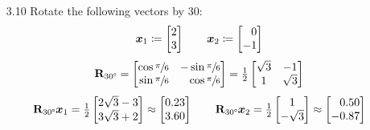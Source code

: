 \documentclass[11pt]{article}
\begin{document}
\begin{enumerate}
    \item[3.10] Rotate the following vectors by 30\degree:
          \[
              \x_1 \coloneq
              \begin{bmatrix}
                  2 \\ 3
              \end{bmatrix}
              \qquad
              \x_2 \coloneq
              \begin{bmatrix*}[r]
                  0 \\ -1
              \end{bmatrix*}
          \]
          \[
              \mat{R}_{30\degree}
              =
              \begin{bmatrix*}[r]
                  \cos \sfrac{\pi}{6} & -\sin \sfrac{\pi}{6} \\
                  \sin \sfrac{\pi}{6} & \cos \sfrac{\pi}{6}  \\
              \end{bmatrix*}
              =
              \tfrac{1}{2}
              \begin{bmatrix*}[c]
                  \sqrt{3} & -1       \\
                  1        & \sqrt{3} \\
              \end{bmatrix*}
          \]
          \vspace{0.5em}
          \[
              \mat{R}_{30\degree} \x_1
              =
              \tfrac{1}{2}
              \begin{bmatrix*}[c]
                  2 \sqrt{3} - 3 \\
                  3 \sqrt{3} + 2 \\
              \end{bmatrix*}
              \approx
              \begin{bmatrix*}[r]
                  0.23 \\
                  3.60 \\
              \end{bmatrix*}
              \qquad
              \mat{R}_{30\degree} \x_2
              =
              \tfrac{1}{2}
              \begin{bmatrix*}[c]
                  1         \\
                  -\sqrt{3} \\
              \end{bmatrix*}
              \approx
              \begin{bmatrix*}[r]
                  0.50  \\
                  -0.87 \\
              \end{bmatrix*}
          \]


\end{enumerate}
\end{document}
